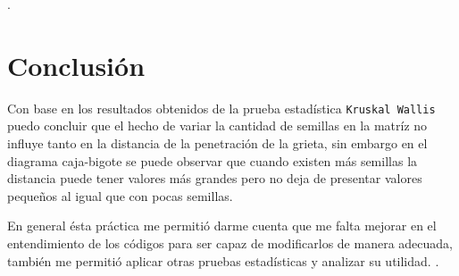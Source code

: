 \documentclass{article}
\begin{document}
\newpage
.
\bigskip

\section{Conclusi\'{o}n}
Con base en los resultados obtenidos de la prueba estadística \texttt{Kruskal Wallis} puedo concluir que el hecho de variar la cantidad de semillas en la matríz no influye tanto en la distancia de la penetración de la grieta, sin embargo en el diagrama caja-bigote se puede observar que cuando existen más semillas la distancia puede tener valores más grandes pero no deja de presentar valores pequeños al igual que con pocas semillas. 
\smallskip

En general ésta práctica me permitió darme cuenta que me falta mejorar en el entendimiento de los códigos para ser capaz de modificarlos de manera adecuada, también me permitió aplicar otras pruebas estadísticas y analizar su utilidad.
\newpage
.
\bigskip



\end{document}
